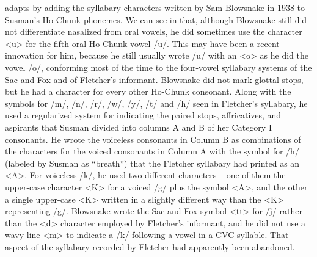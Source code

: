 \documentclass[output=paper]{LSP/langsci}
\begin{document}
 adapts  by adding the syllabary characters written by Sam Blowsnake in 1938 to Susman's Ho-Chunk phonemes. We can see in  that, although Blowsnake still did not differentiate nasalized from oral vowels, he did sometimes use the character <u> for the fifth oral Ho-Chunk vowel /u/. This may have been a recent innovation for him, because he still usually wrote /u/ with an <o> as he did the vowel /o/, conforming most of the time to the four-vowel syllabary systems of the Sac and Fox and of Fletcher's informant. Blowsnake did not mark glottal stops, but he had a character for every other Ho-Chunk consonant. Along with the symbols for /m/, /n/, /r/, /w/, /y/, /t/ and /h/ seen in Fletcher's syllabary, he used a regularized system for indicating the paired stops, affricatives, and aspirants that Susman divided into columns A and B of her Category I consonants. He wrote the voiceless consonants in Column B as combinations of the characters for the voiced consonants in Column A with the symbol for /h/ (labeled by Susman as ``breath'') that the Fletcher syllabary had printed as an <A>. For voiceless /k/, he used two different characters -- one of them the upper-case character <K> for a voiced /g/ plus the symbol <A>, and the other a single upper-case <K> written in a slightly different way than the <K> representing /g/. Blowsnake wrote the Sac and Fox symbol <tt> for /\v{j}/ rather than the <d> character employed by Fletcher's informant, and he did not use a wavy-line <m> to indicate a /k/ following a vowel in a CVC syllable. That aspect of the syllabary recorded by Fletcher had apparently been abandoned.
\end{document}
